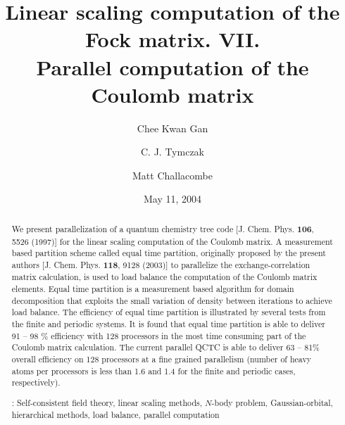 \commentoutA{\documentclass[prl,aps,twocolumn,twocolumngrid,superbib]{revtex4}}
\begin{document}
\title[Short Title]{
Linear scaling computation of the Fock matrix. VII. \\
Parallel computation of the Coulomb matrix}

\author{Chee Kwan Gan\footnotemark[1]}
\author{C. J. Tymczak\footnotemark[2]}
\author{Matt Challacombe\footnotemark[3]}


\date{May 11, 2004}

\begin{abstract}
We present parallelization of a quantum chemistry tree code
[J. Chem. Phys. {\bf 106}, 5526 (1997)] for the linear scaling
computation of the Coulomb matrix. A measurement based partition
scheme called equal time partition, originally proposed by the present
authors [J. Chem. Phys. {\bf 118}, 9128 (2003)] to parallelize the
exchange-correlation matrix calculation, is used to load balance the
computation of the Coulomb matrix elements.  Equal time partition is a
measurement based algorithm for domain decomposition that exploits the
small variation of density between iterations to achieve load
balance. The efficiency of equal time partition is illustrated by
several tests from the finite and periodic systems.  It is found that
equal time partition is able to deliver 91 -- 98 \% efficiency with
128 processors in the most time consuming part of the
Coulomb matrix calculation.
The current parallel QCTC is able to deliver 63 -- 81\% overall
efficiency on 128 processors at a fine grained parallelism (number of
heavy atoms per processors is less than 1.6 and 1.4 for the finite and
periodic cases, respectively).


\smallskip
{}:
Self-consistent field theory, linear scaling methods, $N$-body problem,
Gaussian-orbital, hierarchical methods,
load balance, parallel computation
\end{abstract}
\maketitle
\end{document}
